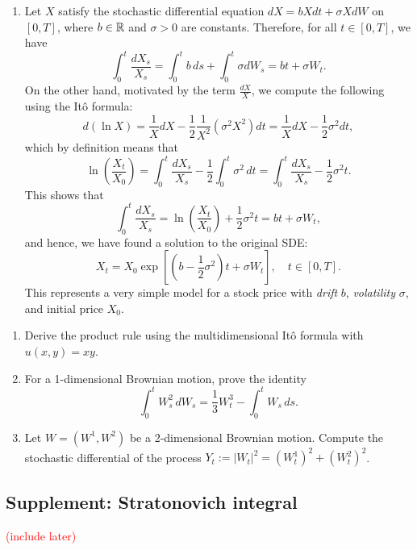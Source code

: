 \begin{example}
\begin{enumerate}[\upshape (i)]
    \item Let $X$ satisfy the stochastic differential equation $dX = bX dt+\sigma XdW$ on $[0,T]$, where $b\in\mathbb{R}$ and $\sigma>0$ are constants. Therefore, for all $t\in [0,T]$, we have
    \begin{equation*}
        \int_0^t \frac{dX_s}{X_s} = \int_0^t b\,ds + \int_0^t \sigma dW_s = bt + \sigma W_t.
    \end{equation*}
    On the other hand, motivated by the term $\frac{dX}{X}$, we compute the following using the It\^{o} formula:
    \begin{equation*}
        d(\ln X) = \frac{1}{X}dX - \frac{1}{2}\frac{1}{X^2}(\sigma^2 X^2)dt = \frac{1}{X}dX - \frac{1}{2}\sigma^2 dt,
    \end{equation*}
    which by definition means that
    \begin{equation*}
        \ln\left(\frac{X_t}{X_0}\right) = \int_0^t \frac{dX_s}{X_s} - \frac{1}{2}\int_0^t \sigma^2 \,dt = \int_0^t \frac{dX_s}{X_s} - \frac{1}{2}\sigma^2 t.
    \end{equation*}
    This shows that
    \begin{equation*}
        \int_0^t \frac{dX_s}{X_s} = \ln\left(\frac{X_t}{X_0}\right) + \frac{1}{2}\sigma^2 t = bt+\sigma W_t,
    \end{equation*}
    and hence, we have found a solution to the original SDE:
    \begin{equation*}
        X_t = X_0 \exp\left[\left(b-\frac{1}{2}\sigma^2\right)t + \sigma W_t\right], \quad t\in [0,T].
    \end{equation*}
    This represents a very simple model for a stock price with \emph{drift} $b$, \emph{volatility} $\sigma$, and initial price $X_0$.
\end{enumerate}
\end{example}

\begin{exercise}
    \begin{enumerate}[\upshape (i)]
        \item Derive the product rule using the multidimensional It\^{o} formula with $u(x,y)=xy$.

        \item For a 1-dimensional Brownian motion, prove the identity
        \begin{equation*}
            \int_0^t W_s^2 \,dW_s = \frac{1}{3}W^3_t - \int_0^t W_s\,ds.
        \end{equation*}

        \item Let $W=(W^1,W^2)$ be a 2-dimensional Brownian motion. Compute the stochastic differential of the process $Y_t := |W_t|^2 = (W^1_t)^2+(W^2_t)^2$.
    \end{enumerate}
\end{exercise}

\subsection{Supplement: Stratonovich integral}
\textcolor{red}{(include later)}